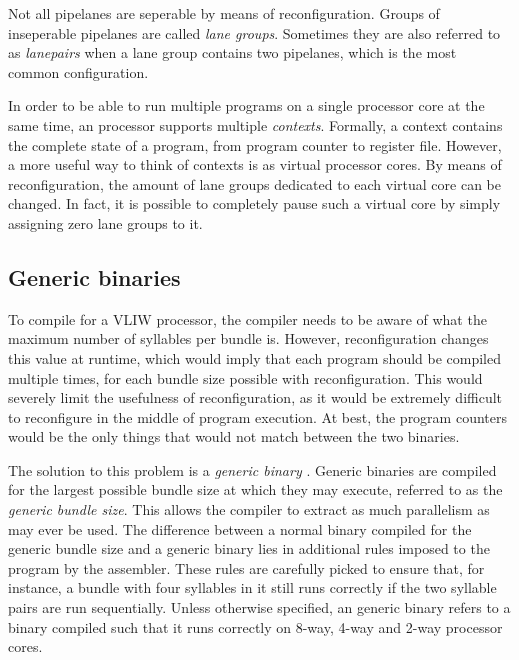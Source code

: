 Not all pipelanes are seperable by means of reconfiguration. Groups of 
inseperable pipelanes are called \textit{lane groups}. Sometimes they are also 
referred to as \textit{lanepairs} when a lane group contains two pipelanes, 
which is the most common configuration.

In order to be able to run multiple programs on a single \rvex{} processor core 
at the same time, an \rvex{} processor supports multiple \textit{contexts}. 
Formally, a context contains the complete state of a program, from program 
counter to register file. However, a more useful way to think of \rvex{} 
contexts is as virtual processor cores. By means of reconfiguration, the amount 
of lane groups dedicated to each virtual core can be changed. In fact, it is 
possible to completely pause such a virtual core by simply assigning zero lane 
groups to it.

\subsection{Generic binaries}
\label{sec:core-ug-intro-gen-bin}

To compile for a VLIW processor, the compiler needs to be aware of what the 
maximum number of syllables per bundle is. However, reconfiguration changes this 
value at runtime, which would imply that each program should be compiled 
multiple times, for each bundle size possible with reconfiguration. This would 
severely limit the usefulness of reconfiguration, as it would be extremely 
difficult to reconfigure in the middle of program execution. At best, the 
program counters would be the only things that would not match between the two 
binaries.

The solution to this problem is a \textit{generic binary} \cite{brandon2013}.
Generic binaries are compiled for the largest possible bundle size at which
they may execute, referred to as the \textit{generic bundle size}. This allows
the compiler to extract as much parallelism as may ever be used. The difference
between a normal binary compiled for the generic bundle size and a generic
binary lies in additional rules imposed to the program by the assembler. These
rules are carefully picked to ensure that, for instance, a bundle with four
syllables in it still runs correctly if the two syllable pairs are run
sequentially. Unless otherwise specified, an \rvex{} generic binary refers to a
binary compiled such that it runs correctly on 8-way, 4-way and 2-way \rvex{}
processor cores.

